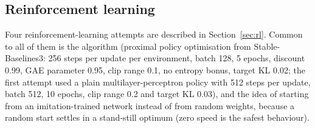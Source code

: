 \subsection{Reinforcement learning}
Four reinforcement-learning attempts are described in Section~\ref{sec:rl}. Common to all of them is the algorithm (proximal policy optimisation from Stable-Baselines3: 256 steps per update per environment, batch 128, 5 epochs, discount 0.99, GAE parameter 0.95, clip range 0.1, no entropy bonus, target KL 0.02; the first attempt used a plain multilayer-perceptron policy with 512 steps per update, batch 512, 10 epochs, clip range 0.2 and target KL 0.03),
and the idea of starting from an imitation-trained network instead of from random weights, because a random start settles in a stand-still optimum (zero speed is the safest behaviour).
